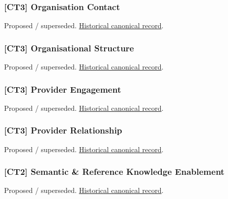 \subsubsection{[CT3] Organisation Contact}

\par\label{element:b7f5108880eb429bb407c87a37b0e23f}
Proposed / superseded. \href{../../../../continuum/strategy/capability/b7f5108880eb429bb407c87a37b0e23f.md}{Historical canonical record}.\par

\subsubsection{[CT3] Organisational Structure}

\par\label{element:19d211cf601c49e5a65665330d0c5c3d}
Proposed / superseded. \href{../../../../continuum/strategy/capability/19d211cf601c49e5a65665330d0c5c3d.md}{Historical canonical record}.\par

\subsubsection{[CT3] Provider Engagement}

\par\label{element:a0777dbd9b0c4528817e99a7f34aa444}
Proposed / superseded. \href{../../../../continuum/strategy/capability/a0777dbd9b0c4528817e99a7f34aa444.md}{Historical canonical record}.\par

\subsubsection{[CT3] Provider Relationship}

\par\label{element:3bb8a3d5b62a4b779442290fe8d5106c}
Proposed / superseded. \href{../../../../continuum/strategy/capability/3bb8a3d5b62a4b779442290fe8d5106c.md}{Historical canonical record}.\par

\subsubsection{[CT2] Semantic \& Reference Knowledge Enablement}

\par\label{element:92a71292710c41b29775d19b98c197d6}
Proposed / superseded. \href{../../../../continuum/strategy/capability/92a71292710c41b29775d19b98c197d6.md}{Historical canonical record}.\par

